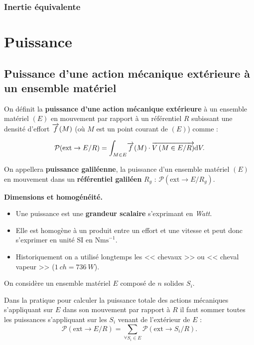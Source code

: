 \documentclass[10pt,fleqn]{article} %
\begin{document}
\subsubsection{Inertie équivalente}
\section{Puissance}
\subsection{Puissance d'une action mécanique extérieure à un ensemble matériel}
\begin{defi}%
On définit la \textbf{puissance d'une action mécanique extérieure} à un ensemble matériel $(E)$ en mouvement par rapport à un référentiel $R$ subissant une densité d'effort $\overrightarrow{f}(M)$ (où $M$ est un point courant de $(E)$) comme :

$$
\mathcal{P}(\text{ext} \rightarrow E/R)=\displaystyle{\int_{M\in E}}\vect{f}(M)\cdot \vectv{M}{E}{R}%
\dd V.
$$
\end{defi}

\begin{rem}%
On appellera \textbf{puissance galiléenne}, la puissance d'un ensemble matériel $(E)$ en mouvement dans un \textbf{référentiel galiléen} $R_g$ : 
$
\mathcal{P}(\text{ext} \rightarrow E/R_g)
$.
\end{rem}%


\begin{warn}\textbf{Dimensions et homogénéité.}
\begin{itemize}
\item Une puissance est une \textbf{grandeur scalaire} s'exprimant en \textit{Watt}.
\item Elle est homogène à un produit entre un effort et une vitesse et peut donc s'exprimer en unité SI en $\text{Nms}^{-1}$.
\item Historiquement on a utilisé longtemps les << chevaux >> ou << cheval vapeur >> ($\SI{1}{ch}= \SI{736}{W}$).
\end{itemize}

\end{warn}

\begin{prop}
On considère un ensemble matériel $E$ composé de $n$ solides $S_i$. 

Dans la pratique pour calculer la puissance totale des actions mécaniques s'appliquant sur $E$ dans son mouvement par rapport à $R$ il faut sommer toutes les puissances s'appliquant sur les $S_i$ venant de l'extérieur de $E$ :
$$
\mathcal{P}(\text{ext} \rightarrow E/R)=\displaystyle{\sum_{\forall S_i \in E}\mathcal{P}(\text{ext} \rightarrow S_i/R)}.
$$
\end{prop}
\end{document}
